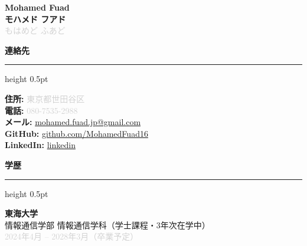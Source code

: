 \documentclass[9.5pt, a4paper]{article}
\newcommand{\leftsection}[1]{%
  \vspace{10pt}
  {\fontsize{10.5}{12.5}\selectfont\textcolor{leftaccent}{\textbf{#1}}}\par
  \vspace{3pt}
  {\color{lightgray}\hrule height 0.5pt}\par
  \vspace{6pt}
}
\begin{document}
\noindent
\colorbox{darksidebar}{%
  \begin{minipage}[t][0.96\textheight][t]{0.34\textwidth}
    \centering
    \vspace*{12pt}
    \begin{minipage}[t]{0.88\textwidth}
      \color{white}
      {\fontsize{18}{22}\selectfont\textbf{Mohamed Fuad}}\\
      \vspace{4pt}
      {\fontsize{10.5}{13.5}\selectfont\textcolor{leftaccent}{\textbf{モハメド フアド}}}\\
      \vspace{3pt}
      {\fontsize{9}{12}\selectfont\textcolor{lightgray}{もはめど ふあど}}
      
      \vspace{8pt}
      \leftsection{連絡先}
      {\fontsize{8.5}{12}\selectfont
      \textcolor{leftaccent}{\textbf{住所:}} \textcolor{lightgray}{東京都世田谷区}\\
      \vspace{3pt}
      \textcolor{leftaccent}{\textbf{電話:}} \textcolor{lightgray}{080-7535-2988}\\
      \vspace{3pt}
      \textcolor{leftaccent}{\textbf{メール:}} \href{mailto:mohamed.fuad.jp@gmail.com}{\color{white}mohamed.fuad.jp@gmail.com}\\
      \vspace{3pt}
      \textcolor{leftaccent}{\textbf{GitHub:}} \href{https://github.com/MohamedFuad16}{\color{white}github.com/MohamedFuad16}\\
      \vspace{3pt}
      \textcolor{leftaccent}{\textbf{LinkedIn:}} \href{https://linkedin.com/in/mohamed-fuad-6b8483278}{\color{white}linkedin}
      }

      \leftsection{学歴}
      {\fontsize{8.5}{12.5}\selectfont
      \textbf{東海大学}\\
      \vspace{2pt}
      情報通信学部 情報通信学科（学士課程・3年次在学中）\\
      \vspace{2pt}
      \textcolor{lightgray}{2024年4月 -- 2028年3月（卒業予定）}
      }


\end{minipage}
\end{minipage}}
\end{document}
